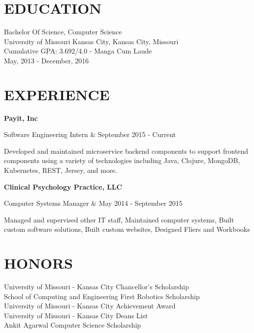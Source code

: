 \documentclass[margin,10pt]{res} %
\begin{document}

\address{ 5534 Lydia Avenue \\ Kansas City, Missouri 64112 \\
(913) 908-6148 \\ cdrm4@mail.umkc.edu \\ http://octopuscabbage.github.io \\}

\begin{resume}
 
\section{EDUCATION}       
 Bachelor Of Science, Computer Science  \\
                University of Missouri Kansas City, Kansas City, Missouri \\ 
                Cumulative GPA: 3.692/4.0  - Manga Cum Laude\\
                May, 2013 - December, 2016
 
 
\section{EXPERIENCE}      

		{\bf Payit, Inc} \\
			\begin{ncolumn}{2}
			Software Engineering Intern & September 2015 - Current
			\end{ncolumn}
			Developed and maintained microservice backend components to support frontend components using a variety of technologies including Java, Clojure, MongoDB, Kubernetes, REST, Jersey, and more.
			
		{\bf Clinical Psychology Practice, LLC} \\
			\begin{ncolumn}{2}
			Computer Systems Manager & May 2014 - September 2015
			\end{ncolumn}
			Managed and supervised other IT staff, Maintained computer systems, Built custom software solutions, Built custom websites, Designed Fliers and Workbooks
		
 
 
\section{HONORS}
University of Missouri - Kansas City Chancellor's Scholarship \\
School of Computing and Engineering First Robotics Scholarship \\ 
University of Missouri - Kansas City Achievement Award  \\
University of Missouri - Kansas City Deans List \\
Ankit Agarwal Computer Science Scholarship


\end{resume}
\end{document}
